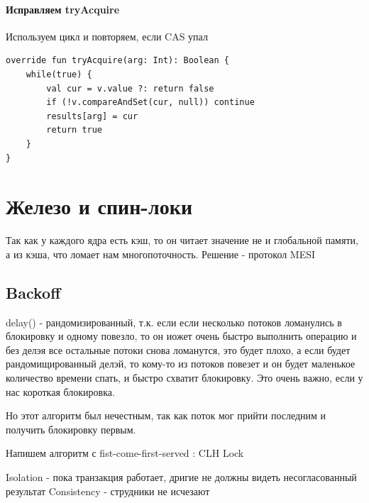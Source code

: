 \documentclass[10pt,a4paper,oneside,titlepage]{article}
\theoremstyle{plain}
\theoremstyle{defenition}
\begin{document}
\paragraph{Исправляем tryAcquire}

Используем цикл и повторяем, если CAS упал

\begin{lstlisting}
override fun tryAcquire(arg: Int): Boolean {
    while(true) {
        val cur = v.value ?: return false
        if (!v.compareAndSet(cur, null)) continue
        results[arg] = cur
        return true
    }
}
\end{lstlisting}



\section{Железо и спин-локи}
Так как у каждого ядра есть кэш, то он читает значение не и глобальной памяти, а из кэша, что ломает нам многопоточность. Решение - протокол MESI

\subsection{Backoff}
delay() - рандомизированный, т.к. если если несколько потоков ломанулись в блокировку и одному повезло, то он иожет очень быстро выполнить операцию и без делэя все остальные потоки снова ломанутся, это будет плохо, а если будет рандомищированный делэй, то кому-то из потоков повезет и он будет маленькое количество времени спать, и быстро схватит блокировку. Это очень важно, если у нас короткая блокировка.

Но этот алгоритм был нечестным, так как поток мог прийти последним и получить блокировку первым.

Напишем алгоритм с fist-come-first-served : CLH Lock

Isolation - пока транзакция работает, дригие не должны видеть несогласованный результат
Consistency - струдники не исчезают
\end{document}

